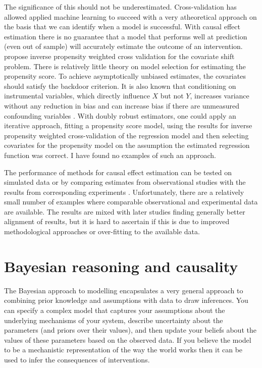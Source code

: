 \documentclass[11pt,a4paper,twoside]{report}
\theoremstyle{plain}
\theoremstyle{definition}
\begin{document}
The significance of this should not be underestimated. Cross-validation has allowed applied machine learning to succeed with a very atheoretical approach on the basis that we can identify when a model is successful. With causal effect estimation there is no guarantee that a model that performs well at prediction (even out of sample) will accurately estimate the outcome of an intervention. \citet{Sugiyama2007} propose inverse propensity weighted cross validation for the covariate shift problem. There is relatively little theory on model selection for estimating the propensity score. To achieve asymptotically unbiased estimates, the covariates should satisfy the backdoor criterion. It is also known that conditioning on instrumental variables, which directly influence $X$ but not $Y$, increases variance without any reduction in bias and can increase bias if there are unmeasured confounding variables \citep{Wooldridge2009,Bhattacharya2012,Pearl2012b,Myers2011}. With doubly robust estimators, one could apply an iterative approach, fitting a propensity score model, using the results for inverse propensity weighted cross-validation of the regression model and then selecting covariates for the propensity model on the assumption the estimated regression function was correct. I have found no examples of such an approach.

The performance of methods for causal effect estimation can be tested on simulated data \citep{Frolich2001,zhao2004using,Hill2011,Dorie2016} or by comparing estimates from observational studies with the results from corresponding experiments \citep{lalonde1986evaluating,Fraker1987,heckman1997matching,heckman1998characterizing,dehejia1999causal,Smith2001,Anglemyer2014}. Unfortunately, there are a relatively small number of examples where comparable observational and experimental data are available. The results are mixed with later studies finding generally better alignment of results, but it is hard to ascertain if this is due to improved methodological approaches or over-fitting to the available data.  

\section{Bayesian reasoning and causality}
\label{sec:bayesian_causality}
The Bayesian approach to modelling encapsulates a very general approach to combining prior knowledge and assumptions with data to draw inferences. You can specify a complex model that captures your assumptions about the underlying mechanisms of your system, describe uncertainty about the parameters (and priors over their values), and then update your beliefs about the values of these parameters based on the observed data. If you believe the model to be a mechanistic representation of the way the world works then it can be used to infer the consequences of interventions.
\end{document}

